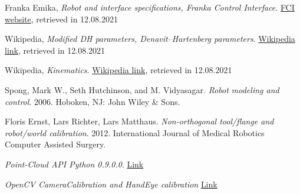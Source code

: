 \begin{thebibliography}{1}

    Franka Emika,
    \emph{Robot and interface specifications, Franka Control Interface}.
    \href{https://frankaemika.github.io/docs/control_parameters.html}{FCI website}, retrieved in 12.08.2021

    Wikipedia,
    \emph{Modified DH parameters, Denavit–Hartenberg parameters}.
    \href{https://en.wikipedia.org/wiki/Denavit%E2%80%93Hartenberg_parameters#Modified_DH_parameters}{Wikipedia link}, retrieved in 12.08.2021

    Wikipedia,
    \emph{Kinematics}.
    \href{https://en.wikipedia.org/wiki/Kinematics}{Wikipedia link}, retrieved in 12.08.2021

    Spong, Mark W., Seth Hutchinson, and M. Vidyasagar.
    \emph{Robot modeling and control}. 2006. Hoboken, NJ: John Wiley \& Sons.

    Floris Ernst, Lars Richter, Lars Matthaus.
    \emph{Non-orthogonal tool/flange and robot/world calibration}. 2012. International Journal of Medical Robotics Computer Assisted Surgery.

    \emph{Point-Cloud API Python 0.9.0.0}.
    \href{http://www.open3d.org/docs/0.9.0/tutorial/Basic/index.html}{Link}

    \emph{OpenCV CameraCalibration and HandEye calibration}
    \href{https://docs.opencv.org/master/dc/dbb/tutorial_py_calibration.html}{Link}

\end{thebibliography}


